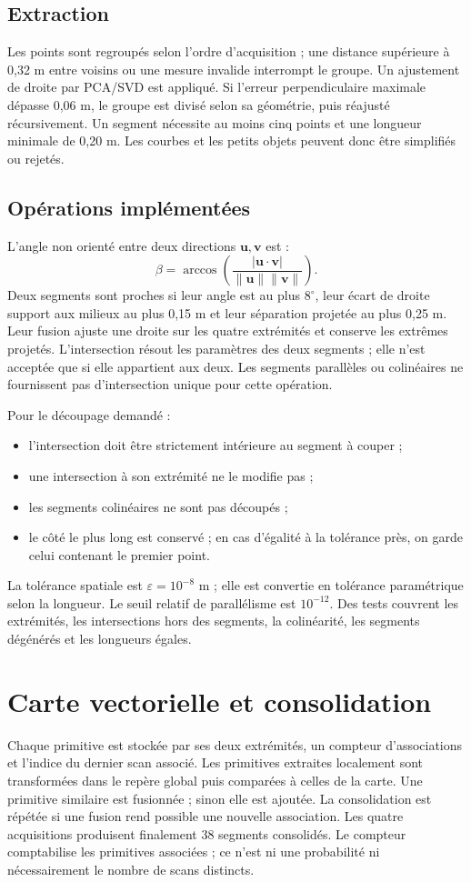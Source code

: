 \documentclass[11pt,a4paper]{article}
\begin{document}
\subsection{Extraction}
Les points sont regroupés selon l'ordre d'acquisition ; une distance supérieure à 0,32 m entre voisins ou une mesure invalide interrompt le groupe. Un ajustement de droite par PCA/SVD est appliqué. Si l'erreur perpendiculaire maximale dépasse 0,06 m, le groupe est divisé selon sa géométrie, puis réajusté récursivement. Un segment nécessite au moins cinq points et une longueur minimale de 0,20 m. Les courbes et les petits objets peuvent donc être simplifiés ou rejetés.

\subsection{Opérations implémentées}
L'angle non orienté entre deux directions $\mathbf u,\mathbf v$ est :
\[
 \beta=\arccos\!\left(\frac{|\mathbf u\cdot\mathbf v|}{\|\mathbf u\|\|\mathbf v\|}\right).
\]
Deux segments sont proches si leur angle est au plus $8^\circ$, leur écart de droite support aux milieux au plus 0,15 m et leur séparation projetée au plus 0,25 m. Leur fusion ajuste une droite sur les quatre extrémités et conserve les extrêmes projetés.
L'intersection résout les paramètres des deux segments ; elle n'est acceptée que si elle appartient aux deux. Les segments parallèles ou colinéaires ne fournissent pas d'intersection unique pour cette opération.

Pour le découpage demandé :
\begin{itemize}
\item l'intersection doit être strictement intérieure au segment à couper ;
\item une intersection à son extrémité ne le modifie pas ;
\item les segments colinéaires ne sont pas découpés ;
\item le côté le plus long est conservé ; en cas d'égalité à la tolérance près, on garde celui contenant le premier point.
\end{itemize}
La tolérance spatiale est $\varepsilon=10^{-8}$ m ; elle est convertie en tolérance paramétrique selon la longueur. Le seuil relatif de parallélisme est $10^{-12}$. Des tests couvrent les extrémités, les intersections hors des segments, la colinéarité, les segments dégénérés et les longueurs égales.

\section{Carte vectorielle et consolidation}
Chaque primitive est stockée par ses deux extrémités, un compteur d'associations et l'indice du dernier scan associé. Les primitives extraites localement sont transformées dans le repère global puis comparées à celles de la carte. Une primitive similaire est fusionnée ; sinon elle est ajoutée. La consolidation est répétée si une fusion rend possible une nouvelle association. Les quatre acquisitions produisent finalement 38 segments consolidés.
Le compteur comptabilise les primitives associées ; ce n'est ni une probabilité ni nécessairement le nombre de scans distincts.
\end{document}
